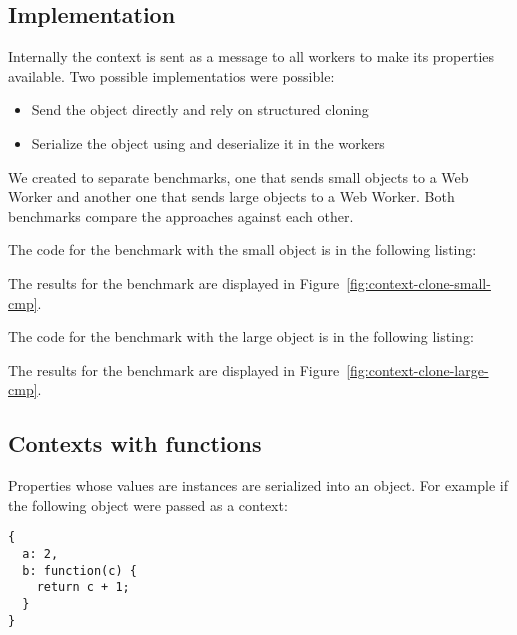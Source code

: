 
\subsection{Implementation}
Internally the context is sent as a message to all workers to make its properties available. Two possible implementatios were possible:
\begin{itemize}
  \item Send the object directly and rely on structured cloning
  \item Serialize the object using  and deserialize it in the workers
\end{itemize}


We created to separate benchmarks, one that sends small objects to a Web Worker and another one that sends large objects to a Web Worker. Both benchmarks compare the approaches against each other.

The code for the benchmark with the small object is in the following listing:

The results for the benchmark are displayed in Figure~\ref{fig:context-clone-small-cmp}.

The code for the benchmark with the large object is in the following listing:

The results for the benchmark are displayed in Figure~\ref{fig:context-clone-large-cmp}.

\subsection{Contexts with functions}\label{sub-sec:contexts-with-function}
Properties whose values are  instances are serialized into an object. For example if the following object were passed as a context:
\begin{lstlisting}[caption=Example context with a function property]
{
  a: 2,
  b: function(c) {
    return c + 1;
  }
}
\end{lstlisting}

